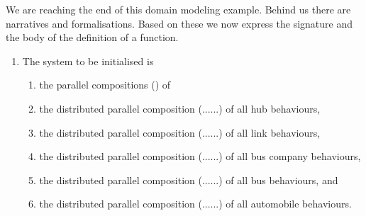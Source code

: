 {\begynd
\pind We are reaching the end of this domain modeling example. 
\begynd
\pind Behind us there are narratives and formalisations. 
\pind Based on these we now express 
\begynd
\pind  the signature and 
\pind the body of the definition
\afslut
\pind of a  function.
\afslut
\afslut
\begin{enumerate}\setei
\item \label{p-ars-00y} The system to be initialised is
\begin{enumerate}
\item \label{p-ars-00x} the parallel
                      compositions ({\PARL}) of 
\item \label{p-ars-010}  the distributed parallel composition
                      ({\PARL}{\LBRACE}...{\BAR}...{\RBRACE}) 
                      of all hub behaviours,
\item \label{p-ars-020}  the distributed parallel composition
                      ({\PARL}{\LBRACE}...{\BAR}...{\RBRACE}) 
                      of all link behaviours,
\item \label{p-ars-030}  the distributed parallel composition
                      ({\PARL}{\LBRACE}...{\BAR}...{\RBRACE}) 
                      of all bus company behaviours,
\item \label{p-ars-040}  the distributed parallel composition
                      ({\PARL}{\LBRACE}...{\BAR}...{\RBRACE}) 
                      of all  bus behaviours, and
\item \label{p-ars-050}  the distributed parallel composition
                      ({\PARL}{\LBRACE}...{\BAR}...{\RBRACE}) 
                      of all automobile behaviours.
\end{enumerate} 
\savei\end{enumerate}
\mnewfoil\LLLL\pos{}{\vspace*{-18mm}}
}
